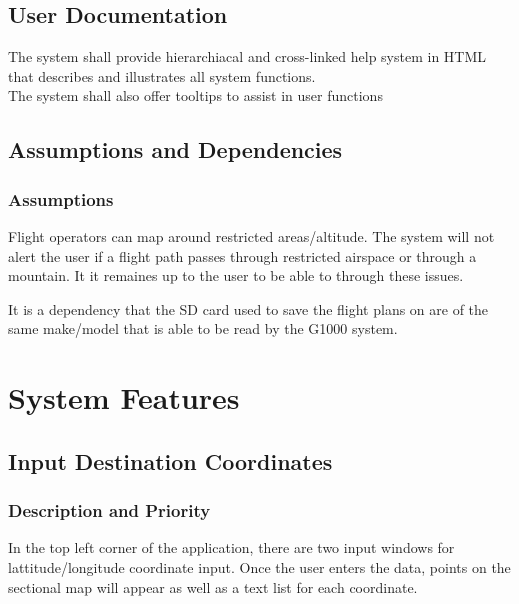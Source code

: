 \documentclass[12pt, letterpaper]{article}
\begin{document}
  \subsection{User Documentation}
      The system shall provide hierarchiacal and cross-linked help system in HTML that
              describes and illustrates all system functions.\\
      The system shall also offer tooltips to assist in user functions \\
  \subsection{Assumptions and Dependencies}
      \subsubsection{Assumptions}
       Flight operators can map around restricted areas/altitude.
       The system will not alert the user if a flight path passes through restricted airspace or through a mountain.
       It it remaines up to the user to be able to through these issues.

       It is a dependency that the SD card used to save the flight plans on are of the same make/model that
       is able to be read by the G1000 system.

    \newpage
\section{System Features}

    \subsection{Input Destination Coordinates}

      \subsubsection{Description and Priority}
  		In the top left corner of the application, there are two input windows for
  		lattitude/longitude coordinate input. Once the user enters the data,
  		points on the sectional map will appear as well as a text list for each
  		coordinate.
\end{document}
